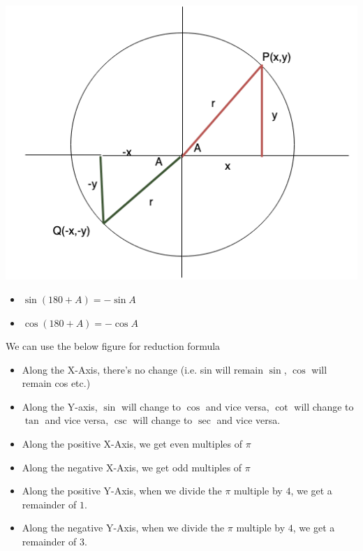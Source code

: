 \documentclass{book}
\begin{document}
	\includegraphics[scale=0.6]{180ptheta}
	
	\begin{mdframed}[backgroundcolor=yellow]
		\begin{itemize}
			\item$\sin(180+A) = -\sin{A}$
			\item $\cos(180+A) = -\cos{A}$
			
		\end{itemize}
	\end{mdframed}
	
	
	We can use the below figure for reduction formula 
	\begin{itemize}
		\item Along the X-Axis, there's no change (i.e. sin will remain $\sin$, $\cos$ will remain cos etc.)
		\item Along the Y-axis, $\sin$ will change to $\cos$ and vice versa, $\cot$ will change to $\tan$ and vice versa, $\csc$ will change to $\sec$ and vice versa.
		\item Along the positive X-Axis, we get even multiples of $\pi$
		\item Along the negative X-Axis, we get odd multiples of $\pi$
		\item Along the positive Y-Axis, when we divide the $\pi$ multiple by $4$, we get a remainder of $1$.
		\item Along the negative Y-Axis, when we divide the $\pi$ multiple by $4$, we get a remainder of $3$.
	\end{itemize}
	
\end{document}
